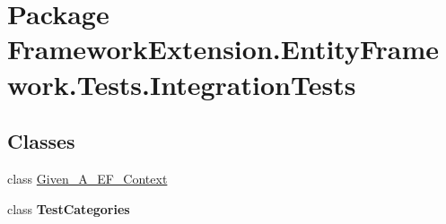 \hypertarget{namespace_framework_extension_1_1_entity_framework_1_1_tests_1_1_integration_tests}{\section{Package Framework\-Extension.\-Entity\-Framework.\-Tests.\-Integration\-Tests}
\label{namespace_framework_extension_1_1_entity_framework_1_1_tests_1_1_integration_tests}
}
\subsection*{Classes}
\begin{DoxyCompactItemize}
\item 
class \hyperlink{class_framework_extension_1_1_entity_framework_1_1_tests_1_1_integration_tests_1_1_given___a___e_f___context}{Given\-\_\-\-A\-\_\-\-E\-F\-\_\-\-Context}
\item 
class {\bfseries Test\-Categories}
\end{DoxyCompactItemize}
